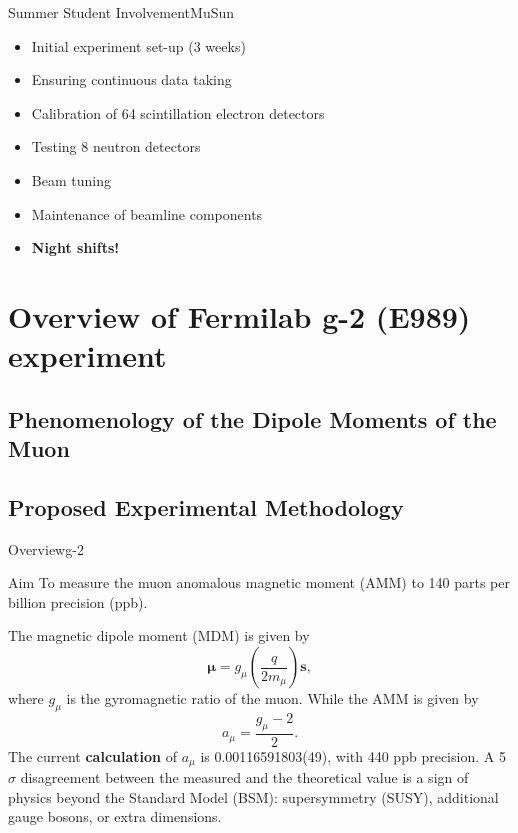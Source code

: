 \documentclass{beamer}
\begin{document}
\begin{frame}{Summer Student Involvement}{MuSun}
\begin{itemize}
\item Initial experiment set-up (3 weeks) 
\item Ensuring continuous data taking 
\item Calibration of 64 scintillation electron detectors 
\item Testing 8 neutron detectors
\item Beam tuning
\item Maintenance of beamline components

\item \textbf{Night shifts!}
\end{itemize}

    
\end{frame}


\section{Overview of Fermilab g-2 (E989) experiment}
\subsection{Phenomenology of the Dipole Moments of the Muon}
\subsection{Proposed Experimental Methodology}

\begin{frame}{Overview}{g-2}
\begin{block}{Aim}
To measure the muon anomalous magnetic moment (AMM) to 140 parts per billion precision (ppb). 
\end{block}
The magnetic dipole moment (MDM) is given by
\begin{equation}
\boldsymbol{\mu}=g_{\mu}\left(\frac{q}{2m_{\mu}}\right) \boldsymbol{s},
\label{eq:mdm}
\end{equation}
where $g_{\mu}$ is the gyromagnetic ratio of the muon. While the AMM is given by
\begin{equation}
a_{\mu}=\frac{g_{\mu}-2}{2}.
\label{eq:AMM}
\end{equation}
The current \textbf{calculation} of $a_{\mu}$ is 0.00116591803(49), with 440 ppb precision. A 5$\sigma$ disagreement between the measured and the theoretical value is a sign of physics beyond the Standard Model (BSM): supersymmetry (SUSY), additional gauge bosons, or extra dimensions. 
\end{frame}
\end{document}
